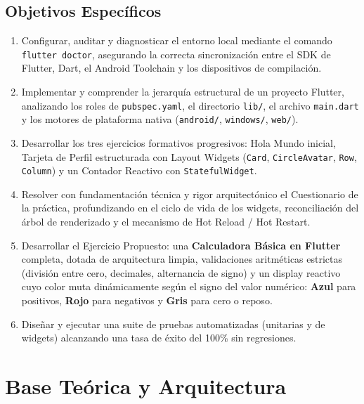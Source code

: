 \documentclass[12pt,a4paper]{article}
\begin{document}
\subsection{Objetivos Específicos}
\begin{enumerate}[label=\textbf{\arabic*.}]
    \item Configurar, auditar y diagnosticar el entorno local mediante el comando \texttt{flutter doctor}, asegurando la correcta sincronización entre el SDK de Flutter, Dart, el Android Toolchain y los dispositivos de compilación.
    \item Implementar y comprender la jerarquía estructural de un proyecto Flutter, analizando los roles de \texttt{pubspec.yaml}, el directorio \texttt{lib/}, el archivo \texttt{main.dart} y los motores de plataforma nativa (\texttt{android/}, \texttt{windows/}, \texttt{web/}).
    \item Desarrollar los tres ejercicios formativos progresivos: Hola Mundo inicial, Tarjeta de Perfil estructurada con Layout Widgets (\texttt{Card}, \texttt{CircleAvatar}, \texttt{Row}, \texttt{Column}) y un Contador Reactivo con \texttt{StatefulWidget}.
    \item Resolver con fundamentación técnica y rigor arquitectónico el Cuestionario de la práctica, profundizando en el ciclo de vida de los widgets, reconciliación del árbol de renderizado y el mecanismo de Hot Reload / Hot Restart.
    \item Desarrollar el Ejercicio Propuesto: una \textbf{Calculadora Básica en Flutter} completa, dotada de arquitectura limpia, validaciones aritméticas estrictas (división entre cero, decimales, alternancia de signo) y un display reactivo cuyo color muta dinámicamente según el signo del valor numérico: \textbf{Azul} para positivos, \textbf{Rojo} para negativos y \textbf{Gris} para cero o reposo.
    \item Diseñar y ejecutar una suite de pruebas automatizadas (unitarias y de widgets) alcanzando una tasa de éxito del 100\% sin regresiones.
\end{enumerate}

\section{Base Teórica y Arquitectura}
\end{document}
